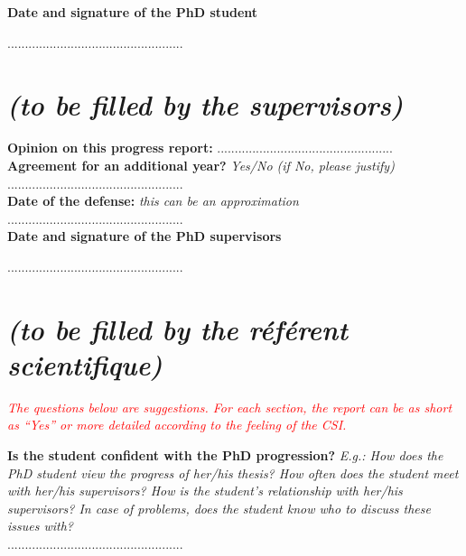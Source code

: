 \documentclass[12pt]{article}
\newcommand{\commentaire}[1]{\small\textit{#1}}
\begin{document}
\noindent\textbf{Date and signature of the PhD student}

..................................................


\newpage
\section*{ \textit{\small (to be filled by the supervisors)}}

\noindent\textbf{Opinion on this progress report:}
..................................................
\\

\noindent\textbf{Agreement for an additional year?}
\commentaire{%
  Yes/No (if No, please justify)\\}
..................................................
\\

\noindent\textbf{Date of the defense:}
\commentaire{%
  this can be an approximation\\}
..................................................
\\


\noindent\textbf{Date and signature of the PhD supervisors}

..................................................

\newpage
\section*{ \textit{\small (to be filled by the r\'ef\'erent scientifique)}}

\commentaire{%
  \textcolor{red}{The questions below are suggestions. For each
    section, the report can be as short as “Yes” or more detailed
    according to the feeling of the CSI.\\}}

\noindent\textbf{Is the student confident with the PhD progression?}
\commentaire{%
  E.g.: How does the PhD student view the progress of
  her/his thesis? How often does the student meet with her/his
  supervisors? How is the student’s relationship with her/his
  supervisors? In case of problems, does the student know who to
  discuss these issues with?\\}
..................................................
\\
\end{document}
